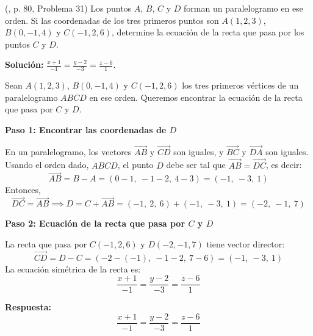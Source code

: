 \begin{prob} (\cite{espinoza2006Algebralineal}, p. 80, Problema 31) Los puntos $A$, $B$, $C$ y $D$ forman un paralelogramo en ese orden. Si las coordenadas de los tres primeros puntos son $A(1,2,3)$, $B(0,-1,4)$ y $C(-1,2,6)$, determine la ecuación de la recta que pasa por los puntos $C$ y $D$. 

\textbf{Solución:} $\frac{x+1}{-1}=\frac{y-2}{-3}=\frac{z-6}{1}$.

\begin{myproof}
Sean $A(1,2,3)$, $B(0,-1,4)$ y $C(-1,2,6)$ los tres primeros vértices de un paralelogramo $ABCD$ en ese orden. Queremos encontrar la ecuación de la recta que pasa por $C$ y $D$.

\textbf{Paso 1: Encontrar las coordenadas de $D$}

En un paralelogramo, los vectores $\overrightarrow{AB}$ y $\overrightarrow{CD}$ son iguales, y $\overrightarrow{BC}$ y $\overrightarrow{DA}$ son iguales. Usando el orden dado, $ABCD$, el punto $D$ debe ser tal que $\overrightarrow{AB} = \overrightarrow{DC}$, es decir:
\[
\overrightarrow{AB} = B - A = (0-1,\ -1-2,\ 4-3) = (-1,\ -3,\ 1)
\]
Entonces,
\[
\overrightarrow{DC} = \overrightarrow{AB} \implies D = C + \overrightarrow{AB} = (-1,\ 2,\ 6) + (-1,\ -3,\ 1) = (-2,\ -1,\ 7)
\]

\textbf{Paso 2: Ecuación de la recta que pasa por $C$ y $D$}

La recta que pasa por $C(-1,2,6)$ y $D(-2,-1,7)$ tiene vector director:
\[
\overrightarrow{CD} = D - C = (-2 - (-1),\ -1 - 2,\ 7 - 6) = (-1,\ -3,\ 1)
\]
La ecuación simétrica de la recta es:
\[
\frac{x + 1}{-1} = \frac{y - 2}{-3} = \frac{z - 6}{1}
\]

\textbf{Respuesta:}
\[
\boxed{
\frac{x + 1}{-1} = \frac{y - 2}{-3} = \frac{z - 6}{1}
}
\]
\end{myproof}

\end{prob}

